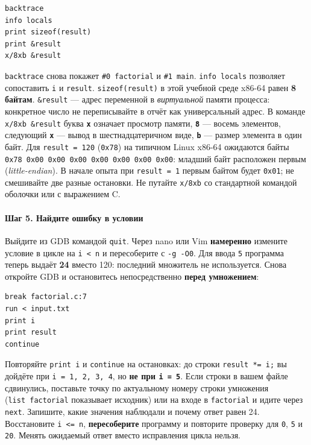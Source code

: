 \begin{verbatim}
backtrace
info locals
print sizeof(result)
print &result
x/8xb &result
\end{verbatim}

\texttt{backtrace} снова покажет \texttt{\#0\ factorial} и
\texttt{\#1\ main}. \texttt{info\ locals} позволяет сопоставить
\texttt{i} и \texttt{result}. \texttt{sizeof(result)} в этой учебной
среде x86-64 равен \textbf{8 байтам}. \texttt{\&result} --- адрес
переменной в \emph{виртуальной} памяти процесса: конкретное число не
переписывайте в отчёт как универсальный адрес. В команде
\texttt{x/8xb\ \&result} буква \textbf{\texttt{x}} означает просмотр
памяти, \textbf{\texttt{8}} --- восемь элементов, следующий
\textbf{\texttt{x}} --- вывод в шестнадцатеричном виде,
\textbf{\texttt{b}} --- размер элемента в один байт. Для
\texttt{result\ =\ 120} (\texttt{0x78}) на типичном Linux x86-64
ожидаются байты \texttt{0x78\ 0x00\ 0x00\ 0x00\ 0x00\ 0x00\ 0x00\ 0x00}:
младший байт расположен первым (\emph{little-endian}). В начале опыта
при \texttt{result\ =\ 1} первым байтом будет \texttt{0x01}; не
смешивайте две разные остановки. Не путайте \texttt{x/8xb} со
стандартной командой оболочки или с выражением C.

\hypertarget{ux448ux430ux433-5-ux43dux430ux439ux434ux438ux442ux435-ux43eux448ux438ux431ux43aux443-ux432-ux443ux441ux43bux43eux432ux438ux438}{%
\paragraph{Шаг 5. Найдите ошибку в
условии}\label{ux448ux430ux433-5-ux43dux430ux439ux434ux438ux442ux435-ux43eux448ux438ux431ux43aux443-ux432-ux443ux441ux43bux43eux432ux438ux438}}

Выйдите из GDB командой \texttt{quit}. Через nano или Vim
\textbf{намеренно} измените условие в цикле на
\texttt{i\ \textless{}\ n} и пересоберите с \texttt{-g\ -O0}. Для ввода
\texttt{5} программа теперь выдаёт \textbf{24} вместо 120: последний
множитель не используется. Снова откройте GDB и остановитесь
непосредственно \textbf{перед умножением}:

\begin{verbatim}
break factorial.c:7
run < input.txt
print i
print result
continue
\end{verbatim}

Повторяйте \texttt{print\ i} и \texttt{continue} на остановках: до
строки \texttt{result\ *=\ i;} вы дойдёте при
\texttt{i\ =\ 1,\ 2,\ 3,\ 4}, но \textbf{не при \texttt{i\ =\ 5}}. Если
строки в вашем файле сдвинулись, поставьте точку по актуальному номеру
строки умножения (\texttt{list\ factorial} показывает исходник) или на
входе в \texttt{factorial} и идите через \texttt{next}. Запишите, какие
значения наблюдали и почему ответ равен 24. Восстановите
\texttt{i\ \textless{}=\ n}, \textbf{пересоберите} программу и повторите
проверку для \texttt{0}, \texttt{5} и \texttt{20}. Менять ожидаемый
ответ вместо исправления цикла нельзя.

